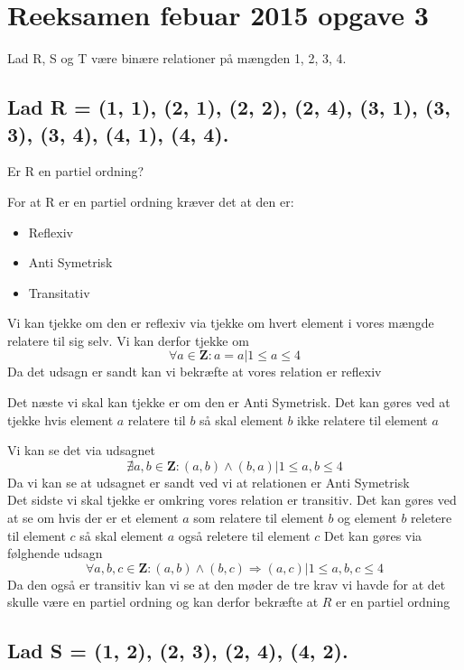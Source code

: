 \section{Reeksamen febuar 2015 opgave 3}

Lad R, S og T være binære relationer på mængden {1, 2, 3, 4}.

\subsection{Lad R = {(1, 1), (2, 1), (2, 2), (2, 4), (3, 1), (3, 3), (3, 4), (4, 1), (4, 4)}.}

Er R en partiel ordning?
\newline

For at R er en partiel ordning kræver det at den er:
    \begin{itemize}  
         \item Reflexiv
         \item Anti Symetrisk
         \item Transitativ
    \end{itemize}

Vi kan tjekke om den er reflexiv via tjekke om hvert element i vores mængde relatere til sig selv.
Vi kan derfor tjekke om 
\[\forall a \in \textbf{Z} : a = a | 1 \leq a \leq 4\]
Da det udsagn er sandt kan vi bekræfte at vores relation er reflexiv\newline
    
Det næste vi skal kan tjekke er om den er Anti Symetrisk. Det kan gøres ved at tjekke hvis element $a$ relatere til $b$ så skal element $b$ ikke relatere til element $a$

Vi kan se det via udsagnet
\[\nexists a,b \in \textbf{Z} : (a,b) \wedge (b,a) | 1 \leq a,b \leq 4\]
Da vi kan se at udsagnet er sandt ved vi at relationen er Anti Symetrisk\\

Det sidste vi skal tjekke er omkring vores relation er transitiv. Det kan gøres ved at se om hvis der er et element $a$ som relatere til element $b$ og element $b$ reletere til element $c$ så skal element $a$ også reletere til element $c$
Det kan gøres via følghende udsagn
\[\forall a,b,c \in \textbf{Z} : (a,b) \wedge (b,c) \Rightarrow (a,c) | 1 \leq a,b,c \leq 4\]
Da den også er transitiv kan vi se at den møder de tre krav vi havde for at det skulle være en partiel ordning og kan derfor bekræfte at $R$ er en partiel ordning

\subsection{Lad S = {(1, 2), (2, 3), (2, 4), (4, 2)}.}

